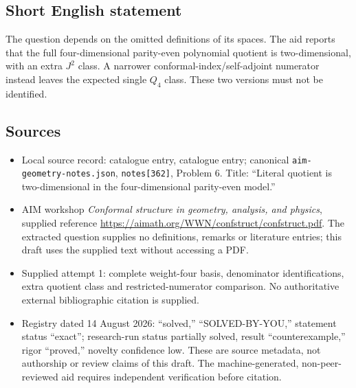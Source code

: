 \documentclass[11pt]{article}
\begin{document}
\subsection{Short English statement}
The question depends on the omitted definitions of its spaces. The aid reports that the full four-dimensional parity-even polynomial quotient is two-dimensional, with an extra \(J^2\) class. A narrower conformal-index/self-adjoint numerator instead leaves the expected single \(Q_4\) class. These two versions must not be identified.
\subsection{Sources}
\begin{itemize}
\item Local source record: catalogue entry, catalogue entry; canonical \texttt{aim-geometry-notes.json}, \texttt{notes[362]}, Problem 6. Title: ``Literal quotient is two-dimensional in the four-dimensional parity-even model.''
\item AIM workshop \emph{Conformal structure in geometry, analysis, and physics}, supplied reference \url{https://aimath.org/WWN/confstruct/confstruct.pdf}. The extracted question supplies no definitions, remarks or literature entries; this draft uses the supplied text without accessing a PDF.
\item Supplied attempt 1: complete weight-four basis, denominator identifications, extra quotient class and restricted-numerator comparison. No authoritative external bibliographic citation is supplied.
\item Registry dated 14 August 2026: ``solved,'' ``SOLVED-BY-YOU,'' statement status ``exact''; research-run status partially solved, result ``counterexample,'' rigor ``proved,'' novelty confidence low. These are source metadata, not authorship or review claims of this draft. The machine-generated, non-peer-reviewed aid requires independent verification before citation.
\end{itemize}
\end{document}
